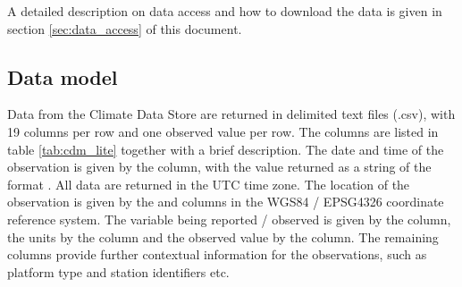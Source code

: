 A detailed description on data access and how to download the data is given in section \ref{sec:data_access} of this document.


\subsection{Data model}
\label{subsection:data_model}
Data from the Climate Data Store are returned in delimited text files (.csv), with 19 columns per row and one observed value per row. 
The columns are listed in table \ref{tab:cdm_lite} together with a brief description.  
The date and time of the observation is given by the  column, with the value returned as a string of the format . 
All data are returned in the UTC time zone.
The location of the observation is given by the  and  columns in the WGS84 / EPSG4326 coordinate reference system. 
The variable being reported / observed is given by the  column, the units by the  column and the observed value by the  column. 
The remaining columns provide further contextual information for the observations, such as platform type and station identifiers etc. 

